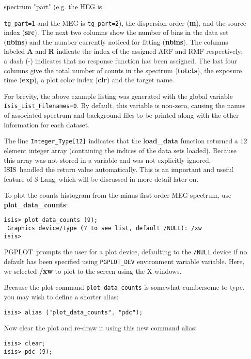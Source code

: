 \documentclass{book}
\newcommand{\isisx}{{\sc ISIS~}}
\newcommand{\pgplot}{{\sc PGPLOT}}
\newcommand{\slang}{{\sc S-Lang}}
\begin{document}
spectrum "part" (e.g. the HEG is {\verb|tg_part=1| and
the MEG is \verb|tg_part=2|), the dispersion order ({\bf m}), and
the source index ({\bf src}).  The next two columns show the
number of bins in the data set ({\bf nbins}) and the number
currently noticed for fitting ({\bf nbins}). The columns
labeled {\bf A} and {\bf R} indicate the index of the assigned
ARF and RMF respectively; a dash (-) indicates that no response
function has been assigned. The last four columns give the
total number of counts in the spectrum ({\bf totcts}), the
exposure time ({\bf exp}), a plot color index ({\bf clr}) and
the target name.

For brevity, the above example listing was generated with the
global variable \verb|Isis_List_Filenames=0|.  By default, this
variable is non-zero, causing the names of associated spectrum
and background files to be printed along with the other
information for each dataset.

The line \verb|Integer_Type[12]| indicates that the {\bf
load\_data} function returned a 12 element integer array
(containing the indices of the data sets loaded).  Because this
array was not stored in a variable and was not explicitly ignored,
\isisx handled the return value automatically.  This is an
important and useful feature of \slang\ which will be discussed in
more detail later on.

To plot the counts histogram from the minus first-order MEG
spectrum, use {\bf plot\_data\_counts}:
\begin{verbatim}
isis> plot_data_counts (9);
 Graphics device/type (? to see list, default /NULL): /xw
isis>
\end{verbatim}
\pgplot\ prompts the user for a plot device, defaulting to
the {\tt /NULL} device if no default has been specified
using {\tt PGPLOT\_DEV} environment
variable variable.  Here, we selected {\bf /xw} to plot to the
screen using the X-windows.

Because the plot command {\tt plot\_data\_counts} is somewhat
cumbersome to type, you may wish to define a shorter alias:
\begin{verbatim}
isis> alias ("plot_data_counts", "pdc");
\end{verbatim}
Now clear the plot and re-draw it using this new command alias:
\begin{verbatim}
isis> clear;
isis> pdc (9);
\end{verbatim}

}
\end{document}
